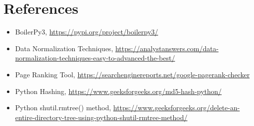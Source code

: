 \documentclass[12pt]{article}
\begin{document}
\section*{References}

\begin{itemize}
    \item{BoilerPy3, \url{https://pypi.org/project/boilerpy3/}}
    \item{Data Normalization Techniques, \url{https://analystanswers.com/data-normalization-techniques-easy-to-advanced-the-best/}}
    \item {Page Ranking Tool, \url{https://searchenginereports.net/google-pagerank-checker}}
    \item{Python Hashing, \url{https://www.geeksforgeeks.org/md5-hash-python/}}
    \item{Python shutil.rmtree() method, \url{https://www.geeksforgeeks.org/delete-an-entire-directory-tree-using-python-shutil-rmtree-method/}}
\end{itemize}
\end{document}
